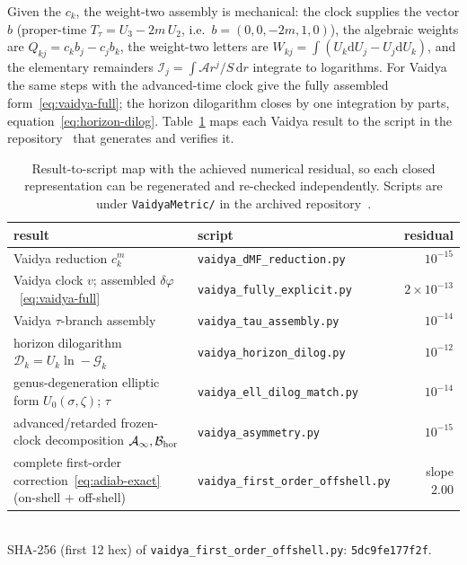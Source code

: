 \documentclass[12pt]{iopart}
\newcommand{\dd}{\mathrm{d}}
\begin{document}
Given the $c_k$, the weight-two assembly is mechanical: the clock supplies the vector
$b$ (proper-time $T_\tau=U_3-2m\,U_2$, i.e.\ $b=(0,0,-2m,1,0)$), the algebraic
weights are $Q_{kj}=c_kb_j-c_jb_k$, the weight-two
letters are $W_{kj}=\int(U_k\dd U_j-U_j\dd U_k)$, and the elementary remainders
$\mathcal{I}_j=\int\mathcal{A}r^j/S\,\dd r$ integrate to logarithms. For Vaidya the
same steps with the advanced-time clock give the fully assembled
form~\eqref{eq:vaidya-full}; the horizon dilogarithm closes by one integration by
parts, equation~\eqref{eq:horizon-dilog}. Table~\ref{tab:script-map} maps each Vaidya result to
the script in the repository~\cite{Rosignoli2026Code} that generates and verifies it.
\begin{table}[htbp]
    \centering
    \caption{Result-to-script map with the achieved numerical residual, so each closed
    representation can be regenerated and re-checked independently. Scripts are under
    \texttt{VaidyaMetric/} in the archived repository~\cite{Rosignoli2026Code}.}
    \label{tab:script-map}
    \small
    \begin{tabular}{@{}p{}>{\raggedright\arraybackslash}p{}r@{}}
        \hline\hline
        result & script & residual\\
        \hline
        Vaidya reduction $c_k^m$
            & \texttt{vaidya\_dMF\_reduction.py} & $10^{-15}$\\
        Vaidya clock $v$; assembled $\delta\varphi$~\eqref{eq:vaidya-full}
            & \texttt{vaidya\_fully\_explicit.py} & $2\times10^{-13}$\\
        Vaidya $\tau$-branch assembly
            & \texttt{vaidya\_tau\_assembly.py} & $10^{-14}$\\
        horizon dilogarithm $\mathcal{D}_k=U_k\ln-\mathcal{G}_k$
            & \texttt{vaidya\_horizon\_dilog.py} & $10^{-12}$\\
        genus-degeneration elliptic form $U_0(\sigma,\zeta)$; $\tau$
            & \texttt{vaidya\_ell\_dilog\_match.py} & $10^{-14}$\\
        advanced/retarded frozen-clock decomposition $\mathcal{A}_\infty,\mathcal{B}_{\rm hor}$
            & \texttt{vaidya\_asymmetry.py} & $10^{-15}$\\
        complete first-order correction~\eqref{eq:adiab-exact} (on-shell $+$ off-shell)
            & \texttt{vaidya\_first\_\allowbreak order\_\allowbreak offshell.py} & slope $2.00$\\
        \hline\hline
    \end{tabular}
    \\[2pt]
    {\footnotesize SHA-256 (first 12 hex) of
    \texttt{vaidya\_first\_order\_offshell.py}: \texttt{5dc9fe177f2f}.}
\end{table}
\end{document}
